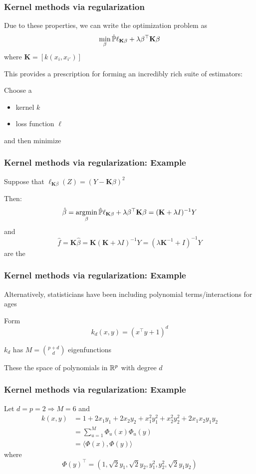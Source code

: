 \documentclass[12pt]{beamer}
\begin{document}
\begin{frame}
\frametitle{Kernel methods via regularization}
Due to these properties, we can write the optimization problem as
\[
\min_{\beta} \hat\P \ell_{\mathbf{K}\beta} + \lambda \beta^{\top} \mathbf{K}\beta
\]
where $\mathbf{K} = [k(x_i,x_{i'})]$

\vsp
This provides a prescription for forming an incredibly rich suite of estimators:

\vsp
Choose a
\begin{itemize}
\item kernel $k$
\item loss function $\ell$
\end{itemize}
and then minimize
\end{frame}

\begin{frame}
\frametitle{Kernel methods via regularization: Example}
Suppose that $\ell_{\mathbf{K}\beta}(Z) = (Y - \mathbf{K}\beta)^2$

\vsp
Then:
\[
\hat{\beta} = \argmin_{\beta} \hat\P \ell_{\mathbf{K}\beta} + \lambda \beta^{\top} \mathbf{K}\beta = (\mathbf{K} + \lambda I)^{-1}Y
\]
and
\[
\hat{f} = \mathbf{K}\hat\beta = \mathbf{K}(\mathbf{K} + \lambda I)^{-1}Y = (\lambda\mathbf{K}^{-1} + I)^{-1}Y
\]
are the 

\end{frame}

\begin{frame}
\frametitle{Kernel methods via regularization: Example}
Alternatively, statisticians have been including polynomial terms/interactions for ages

\vsp
Form
\[
k_d(x,y) = (x^{\top}y + 1)^d 
\]

\vsp
$k_d$ has $M = {p + d \choose d}$ eigenfunctions

\vsp These  the space of polynomials in $\R^{p}$ with degree $d$
\end{frame}
\begin{frame}
\frametitle{Kernel methods via regularization: Example}

 Let $d = p = 2 \Rightarrow M = 6$ and
\begin{align*}
k(x,y) & = 1 + 2x_1y_1 + 2x_2y_2 + x_1^2y_1^2 + x_2^2y_2^2 + 2x_1x_2y_1y_2  \\
& = 
\sum_{u = 1}^M \Phi_u(x) \Phi_u(y) \\
& =
\langle \Phi(x) , \Phi(y) \rangle
\end{align*}
where\Note
\[
\Phi(y)^{\top}  = (1, \sqrt{2}y_1,\sqrt{2}y_2,y_1^2,y_2^2,\sqrt{2}y_1y_2)
\]
\end{frame}
\end{document}
